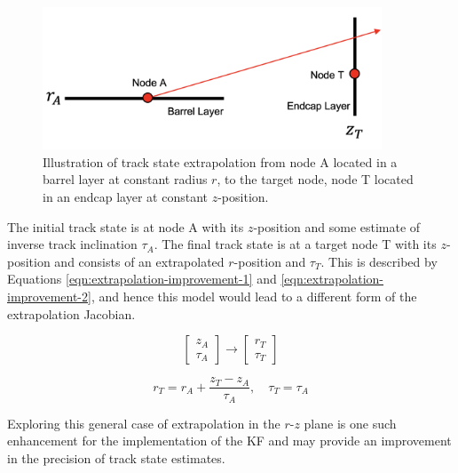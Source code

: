 \begin{figure}[htbp]
    \centering
    \includegraphics[width=0.9\textwidth]{images/7-results/improvement-extrapolation.png}
    \caption{Illustration of track state extrapolation from node A located in a barrel layer at constant radius $r$, to the target node, node T located in an endcap layer at constant $z$-position.}
    \label{fig:improvement-extrapolation}%
\end{figure}


The initial track state is at node A with its $z$-position and some estimate of inverse track inclination $\tau_A$. The final track state is at a target node T with its $z$-position and consists of an extrapolated $r$-position and $\tau_T$. This is described by Equations \eqref{eqn:extrapolation-improvement-1}  and \eqref{eqn:extrapolation-improvement-2}, and hence this model would lead to a different form of the extrapolation Jacobian.

\begin{equation}
    \begin{bmatrix} z_A \\ \tau_A \end{bmatrix} 
    \rightarrow
    \begin{bmatrix} r_T \\ \tau_T \end{bmatrix} 
    \label{eqn:extrapolation-improvement-1}
\end{equation}

\begin{equation}
    r_T = r_A + \frac{z_T - z_A}{\tau_A}, \quad \tau_T = \tau_A
    \label{eqn:extrapolation-improvement-2}
\end{equation}


Exploring this general case of extrapolation in the $r$-$z$ plane is one such enhancement for the implementation of the KF and may provide an improvement in the precision of track state estimates.







